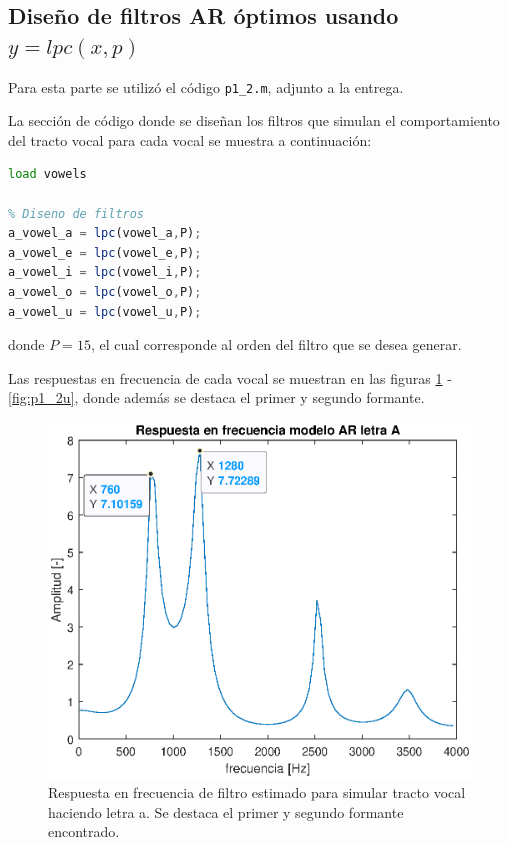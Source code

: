\subsection{Diseño de filtros AR óptimos usando $y = lpc(x,p)$}

Para esta parte se utilizó el código \texttt{p1\_2.m}, adjunto a la entrega.

La sección de código donde se diseñan los filtros que simulan el comportamiento del tracto vocal para cada vocal se muestra a continuación:
\begin{lstlisting}[language = octave]
load vowels

% Diseno de filtros
a_vowel_a = lpc(vowel_a,P);
a_vowel_e = lpc(vowel_e,P);
a_vowel_i = lpc(vowel_i,P);
a_vowel_o = lpc(vowel_o,P);
a_vowel_u = lpc(vowel_u,P);
\end{lstlisting}
donde $P = 15$, el cual corresponde al orden del filtro que se desea generar.

Las respuestas en frecuencia de cada vocal se muestran en las figuras \ref{fig:p1_2a} - \ref{fig:p1_2u}, donde además se destaca el primer y segundo formante.

\begin{figure}[H]
    \centering
    \includegraphics[width = .8\linewidth]{figures/p1_2a.eps}
    \caption{Respuesta en frecuencia de filtro estimado para simular tracto vocal haciendo letra a. Se destaca el primer y segundo formante encontrado.}
    \label{fig:p1_2a}
\end{figure}

